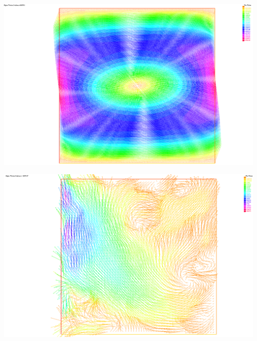 \documentclass[french]{beamer}
\begin{document}
\begin{frame}
  \begin{center}
    \includegraphics[scale=0.19]{images/WF_p2n.png}
  \end{center}
\end{frame}

\begin{frame}
  \begin{center}
    \includegraphics[scale=0.19]{images/WF.png}
  \end{center}
\end{frame}
\end{document}
